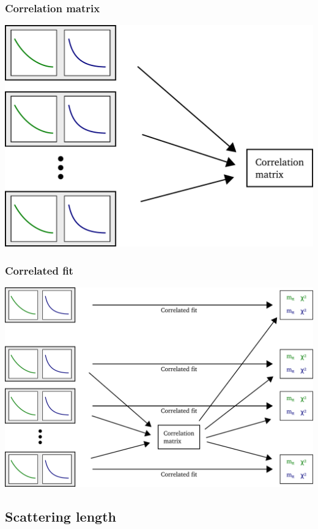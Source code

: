 \documentclass[english, fleqn]{beamer}
\begin{document}
\begin{frame}
    \frametitle{Correlation matrix}
    \includegraphics[scale=\scale]{sketches/05-matrix.pdf}
\end{frame}

\begin{frame}
    \frametitle{Correlated fit}
    \includegraphics[scale=\scale]{sketches/06-fit.pdf}
\end{frame}

\subsection{Scattering length}
\end{document}
